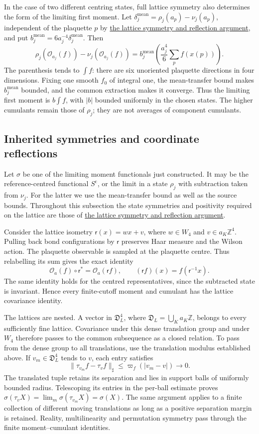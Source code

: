 \documentclass[11pt,letterpaper,reqno]{amsart}
\theoremstyle{definition}
\theoremstyle{remark}
\newcommand{\cO}{\mathcal O}
\begin{document}
In the case of two different centring states, full lattice symmetry
also determines the form of the limiting first moment. Let
$\delta_j^{\mathrm{mean}}=\rho_j(a_p)-\nu_j(a_p)$, independent of the plaquette $p$ by
\hyperref[hyp:gibbs-reflections]{the lattice symmetry and reflection argument}, and put $b_j^{\mathrm{mean}}=6a_j^{-4}\delta_j^{\mathrm{mean}}$. Then
\[
 \rho_j(\cO_{a_j}(f))-\nu_j(\cO_{a_j}(f))
     =b_j^{\mathrm{mean}}\left(\frac{a_j^4}{6}\sum_pf(x(p))\right).
\]
The parenthesis tends to $\int f$: there are six unoriented
plaquette directions in four dimensions. Fixing one smooth $f_0$ of
integral one, the mean-transfer bound makes $b_j^{\mathrm{mean}}$ bounded, and the
common extraction makes it converge. Thus the limiting first moment is
$b\int f$, with $|b|$ bounded uniformly in the chosen states. The
higher cumulants remain those of $\rho_j$; they are not averages of
component cumulants.


\subsection{Inherited symmetries and coordinate reflections}

Let $\sigma$ be one of the limiting moment functionals just constructed.
It may be the reference-centred functional $S^{\mathrm c}$, or the
limit in a state $\rho_j$ with subtraction taken from $\nu_j$. For
the latter we use the mean-transfer bound as well as the source bounds.
Throughout this subsection the state symmetries and positivity required
on the lattice are those of \hyperref[hyp:gibbs-reflections]{the lattice symmetry and reflection argument}.

Consider the lattice isometry $\mathsf r(x)=wx+v$, where $w\in W_4$
and $v\in a_K\mathbb Z^4$. Pulling back bond configurations by
$\mathsf r$ preserves Haar measure and the Wilson action. The plaquette
observable is sampled at the plaquette centre. Thus relabelling its
sum gives the exact identity
\[
 \cO_a(f)\circ\mathsf r^*=\cO_a(\mathsf rf),
 \qquad (\mathsf rf)(x)=f(\mathsf r^{-1}x).
\]
The same identity holds for the centred representatives, since the
subtracted state is invariant. Hence every finite-cutoff moment and
cumulant has the lattice covariance identity.

The lattices are nested. A vector in
$\mathfrak D_L^4$, where $\mathfrak D_L=\bigcup_Ka_K\mathbb Z$,
belongs to every sufficiently fine lattice. Covariance under this dense
translation group and under $W_4$ therefore passes to the common
subsequence as a closed relation. To pass from the dense group to all
translations, use the translation modulus established above. If
$v_m\in\mathfrak D_L^4$ tends to $v$, each entry satisfies
\[
 \|\tau_{v_m}f-\tau_vf\|_\sharp\le\varpi_f(|v_m-v|)\longrightarrow0.
\]
The translated tuple retains its separation and lies in support balls
of uniformly bounded radius. Telescoping its entries in the per-ball
estimate proves $\sigma(\tau_vX)=\lim_m\sigma(\tau_{v_m}X)
=\sigma(X)$. The same argument applies to a finite collection of
different moving translations as long as a positive separation margin
is retained. Reality, multilinearity and permutation symmetry pass
through the finite moment--cumulant identities.
\end{document}
